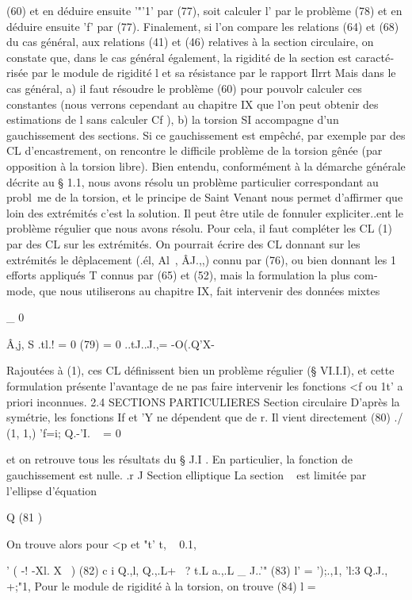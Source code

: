 {{(60) et en déduire ensuite '"'1' par (77), soit calculer l' par le problème (78) et en déduire ensuite 'f' par (77). 
Finalement, si l'on compare les relations (64) et (68) du cas géné­ral, aux relations (41) et (46) relatives à la section circulaire, on consta­te que, dans le cas général également, la rigidité de la section est caracté­risée par le module de rigidité l et sa résistance par le rapport Ilrrt Mais dans le cas général, a) il faut résoudre le problème (60) pour pouvolr calculer ces constantes (nous verrons cependant au chapitre IX que l'on peut obtenir des estimations de l sans calculer Cf ), b) la torsion SI accompagne d'un gauchissement des sections. Si ce gauchissement est empêché, par exemple par des CL d'encastrement, on rencontre le difficile problème de la torsion gênée (par opposition à la torsion libre). 
Bien entendu, conformément à la démarche générale décrite au § 1.1, nous avons résolu un problème particulier correspondant au probl~me de la tor­sion, et le principe de Saint Venant nous permet d'affirmer que loin des ex­trémités c'est la solution. Il peut être utile de fonnuler expliciter..ent le problème régulier que nous avons résolu. Pour cela, il faut compléter les CL 
(1) par des CL sur les extrémités. On pourrait écrire des CL donnant sur les extrémités le dêplacement (.él, Al~, ÂJ.,,) connu par (76), ou bien donnant les 
1 
~ 
efforts appliqués T connus par (65) et (52), mais la formulation la plus com­
mode, que nous utiliserons au chapitre IX, fait intervenir des données mixtes 

_ 0 

Â,j, S .tl.! = 0 
(79) 
= 0 ..tJ..J.,= -O(.Q'X-~
 

Rajoutées à (1), ces CL définissent bien un problème régulier (§ VI.I.I), et cette formulation présente l'avantage de ne pas faire intervenir les fonctions 
<f ou 1t' a priori inconnues. 
2.4 SECTIONS PARTICULIERES 
Section circulaire 
D'après la symétrie, les fonctions If et 'Y ne dépendent que de r. Il vient directement 
(80) ./ (1, 1,)
'f=i; Q.-'I. ~ = 0 

et on retrouve tous les résultats du § J.I . En particulier, la fonction de 
gauchissement est nulle. 
.r 
J
Section elliptique 
La section ~ est limitée par 
l'ellipse d'équation 

Q 
(81 ) 

On trouve alors pour <p et "t' 
t, ~ 
0.1, }}' 
( -! -Xl. X~ )
(82) c
i 
Q.,l,
Q.,.L+ ~? t.L 
a.,.L _ J..'" 
(83) 
l' = ');.,1, 'l:3 
Q.J., +;"1, Pour le module de rigidité à la torsion, on trouve 
(84) 
l = 

